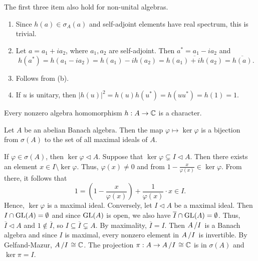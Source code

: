 \begin{remark}
  The first three item also hold for non-unital algebras.
\end{remark}

\begin{myproof}
  \begin{enumerate}
    \item Since $h(a) \in \sigma_A(a)$ and self-adjoint elements have real spectrum, this is trivial.
    \item Let $a = a_1 + i a_2$, where $a_1, a_2$ are self-adjoint. Then $a^* = a_1 - i a_2$ and 
    $$h(a^*) = h(a_1 - i a_2) = h(a_1) - i h(a_2) = \overline{h(a_1) + i h(a_2)} = \overline{h(a)}.$$
    \item Follows from (b).
    \item If $u$ is unitary, then $|h(u)|^2 = h(u) h(u^*) = h(u u^*) = h(1) = 1$. \qedhere
  \end{enumerate}
\end{myproof}

\begin{corollary}
  Every nonzero algebra homomorphism $h: A \to \mathbb {C}$ is a character.
\end{corollary}

\begin{proposition}
  Let $A$ be an abelian Banach algebra. Then the map $\varphi \mapsto \ker \varphi$
  is a bijection from $\sigma (A)$ to the set of all maximal ideals of $A$.
\end{proposition}

\begin{myproof}
  If $\varphi \in \sigma (A)$, then $\ker \varphi \lhd A$. Suppose that $\ker \varphi \subsetneq I \lhd A$. Then there exists
  an element $x \in I \setminus \ker \varphi$. Thus, $\varphi(x) \neq 0$ and 
  from $1 - \frac{x}{\varphi(x)} \in \ker \varphi$. From there, it follows that 
  $$1 = \left(1 - \frac{x}{\varphi(x)}\right) + \frac{1}{\varphi(x)} \cdot x \in I.$$
  Hence, $\ker \varphi$ is a maximal ideal.
  Conversely, let $I \lhd A$ be a maximal ideal. Then $I \cap \operatorname{GL}(A) = \emptyset$
  and since $\operatorname{GL}(A)$ is open, we also have $\overline{I} \cap \operatorname{GL}(A) = \emptyset$.
  Thus, $\overline{I} \lhd A$ and $1 \notin \overline{I}$, so $I \subseteq \overline{I} \subsetneq A$.
  By maximality, $\overline{I} = I$. Then $\quot{A}{I}$ is a Banach algebra and since $I$ is maximal,
  every nonzero element in $\quot{A}{I}$ is invertible. By Gelfand-Mazur, $\quot{A}{I} \cong \C$.
  The projection $\pi: A \to \quot{A}{I} \cong \C$ is in $\sigma (A)$ and $\ker \pi = I$.
\end{myproof}

